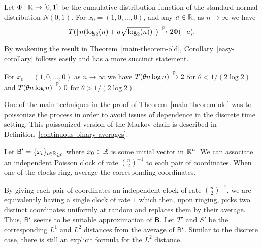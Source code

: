 \documentclass[12pt]{article}
\begin{document}
\begin{thm} \label{main-theorem-old}
	Let $\Phi : \mathbb{R} \to [0, 1]$ be the cumulative distribution function of the standard normal distribution $N(0, 1)$. For $x_0 = (1, 0, \ldots, 0)$, and any $a \in \mathbb{R}$, as $n \to \infty$ we have 
	\[
		T(\lfloor n(\log_2(n) + a \sqrt{\log_2(n)}) \rfloor) \xrightarrow{\mathbb{P}} 2 \Phi(-a).
	\]
\end{thm}

By weakening the result in Theorem~\ref{main-theorem-old}, Corollary~\ref{easy-corollary} follows easily and has a more succinct statement. 

\begin{cor} \label{easy-corollary}
	For $x_0 = (1, 0, \ldots, 0)$ as $n \to \infty$ we have $T(\theta n \log n) \xrightarrow{\mathbb{P}} 2$ for $\theta < 1/(2 \log 2)$ and $T(\theta n \log n) \xrightarrow{\mathbb{P}} 0$ for $\theta > 1/(2 \log 2)$. 
\end{cor}

One of the main techniques in the proof of Theorem~\ref{main-theorem-old} was to poissonize the process in order to avoid issues of dependence in the discrete time setting. This poissonized version of the Markov chain is described in Definition~\ref{continuous-binary-averages}. 

\begin{defn} \label{continuous-binary-averages}
	Let $\mathsf{B}' = \{x_t\}_{t \in \mathbb{R}_{\geq 0}}$ where $x_0 \in \mathbb{R}$ is some initial vector in $\mathbb{R}^n$. We can associate an independent Poisson clock of rate $\binom{n}{2}^{-1}$ to each pair of coordinates. When one of the clocks ring, average the corresponding coordinates.  
\end{defn}

By giving each pair of coordinates an independent clock of rate $\binom{n}{2}^{-1}$, we are equivalently having a single clock of rate $1$ which then, upon ringing, picks two distinct coordinates uniformly at random and replaces them by their average. Thus, $\mathsf{B}'$ seems to be suitable approximation of $\mathsf{B}$. Let $T'$ and $S'$ be the corresponding $L^1$ and $L^2$ distances from the average of $\mathsf{B}'$. Similar to the discrete case, there is still an explicit formula for the $L^2$ distance.
\end{document}
